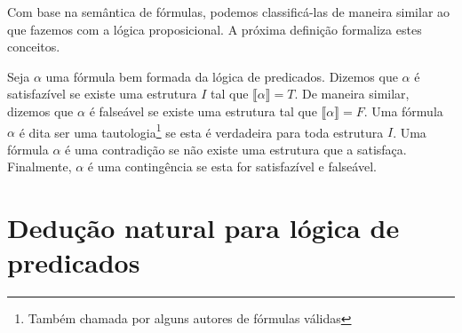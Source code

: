 Com base na semântica de fórmulas, podemos classificá-las de maneira
similar ao que fazemos com a lógica proposicional. A próxima definição
formaliza estes conceitos.
\begin{Definition}
Seja $\alpha$ uma fórmula bem formada da lógica de predicados. Dizemos
que $\alpha$ é satisfazível se existe uma estrutura $I$ tal que
$\llbracket \alpha \rrbracket = T$. De maneira similar, dizemos que
$\alpha$ é falseável se existe uma estrutura tal que $\llbracket \alpha
\rrbracket = F$. Uma fórmula $\alpha$ é dita ser uma tautologia\footnote{Também
chamada por alguns autores de fórmulas válidas} se esta é verdadeira
para toda estrutura $I$. Uma fórmula $\alpha$ é uma contradição se não
existe uma estrutura que a satisfaça. Finalmente, $\alpha$ é uma
contingência se esta for satisfazível e falseável.
\end{Definition}


\section{Dedução natural para lógica de predicados}